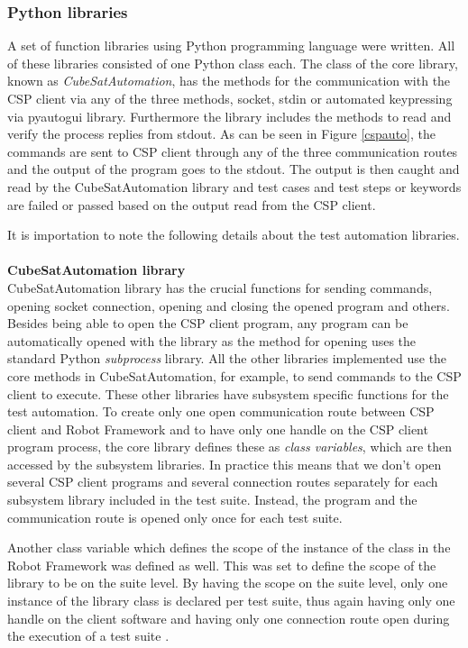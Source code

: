 \documentclass[english,12pt,a4paper,pdftex,elec,utf8]{aaltothesis}
\begin{document}
\subsubsection{Python libraries}
A set of function libraries using Python programming language were written. All of these libraries consisted of one Python class each. The class of the core library, known as \textit{CubeSatAutomation}, has the methods for the communication with the CSP client via any of the three methods, socket, stdin or automated keypressing via pyautogui library. Furthermore the library includes the methods to read and verify the process replies from stdout.
As can be seen in Figure \ref{cspauto}, the commands are sent to CSP client through any of the three communication routes and the output of the program goes to the stdout. The output is then caught and read by the CubeSatAutomation library and test cases and test steps or keywords are failed or passed based on the output read from the CSP client. \par
It is importation to note the following details about the test automation libraries. 
\\
\\
\textbf{CubeSatAutomation library}\\
CubeSatAutomation library has the crucial functions for sending commands, opening socket connection, opening and closing the opened program and others. Besides being able to open the CSP client program, any program can be automatically opened with the library as the method for opening uses the standard Python \textit{subprocess} library. All the other libraries implemented use the core methods in CubeSatAutomation, for example, to send commands to the CSP client to execute. These other libraries have subsystem specific functions for the test automation. To create only one open communication route between CSP client and Robot Framework and to have only one handle on the CSP client program process, the core library defines these as \textit{class variables}, which are then accessed by the subsystem libraries. In practice this means that we don't open several CSP client programs and several connection routes separately for each subsystem library included in the test suite. Instead, the program and the communication route is opened only once for each test suite.\par 
Another class variable which defines the scope of the instance of the class in the Robot Framework was defined as well. This was set to define the scope of the library to be on the suite level. By having the scope on the suite level, only one instance of the library class is declared per test suite, thus again having only one handle on the client software and having only one connection route open during the execution of a test suite \cite{robotuserguide}.\par 
\end{document}
